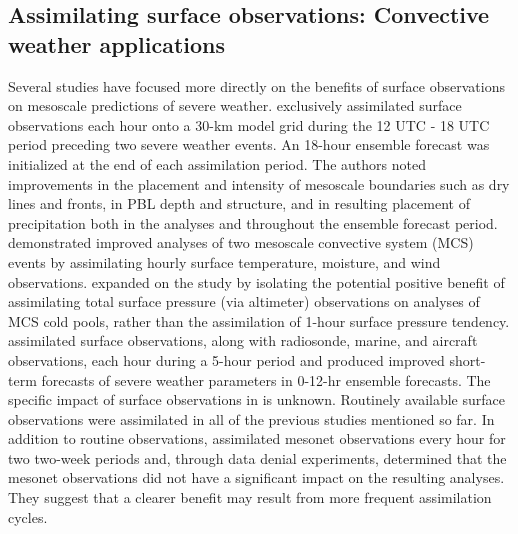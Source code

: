 \subsection{Assimilating surface observations: Convective weather applications}
Several studies have focused more directly on the benefits of surface observations on mesoscale predictions of severe weather. \citet{fujitaetal07} exclusively assimilated surface observations each hour onto a 30-km model grid during the 12 UTC - 18 UTC period preceding two severe weather events. An 18-hour ensemble forecast was initialized at the end of each assimilation period. The authors noted improvements in the placement and intensity of mesoscale boundaries such as dry lines and fronts, in PBL depth and structure, and in resulting placement of precipitation both in the analyses and throughout the ensemble forecast period. \citet{stensrudetal09b} demonstrated improved analyses of two mesoscale convective system (MCS) events by assimilating hourly surface temperature, moisture, and wind observations. \citet{wheatleystensrud10} expanded on the \citet{stensrudetal09b} study by isolating the potential positive benefit of assimilating total surface pressure (via altimeter) observations on analyses of MCS cold pools, rather than the assimilation of 1-hour surface pressure tendency. \citet{wheatleyetal12} assimilated surface observations, along with radiosonde, marine, and aircraft observations, each hour during a 5-hour period and produced improved short-term forecasts of severe weather parameters in 0-12-hr ensemble forecasts. The specific impact of surface observations in \citet{wheatleyetal12} is unknown. Routinely available surface observations were assimilated in all of the previous studies mentioned so far. In addition to routine observations, \citet{knopfmeierstensrud13} assimilated mesonet observations every hour for two two-week periods and, through data denial experiments, determined that the mesonet observations did not have a significant impact on the resulting analyses. They suggest that a clearer benefit may result from more frequent assimilation cycles.

